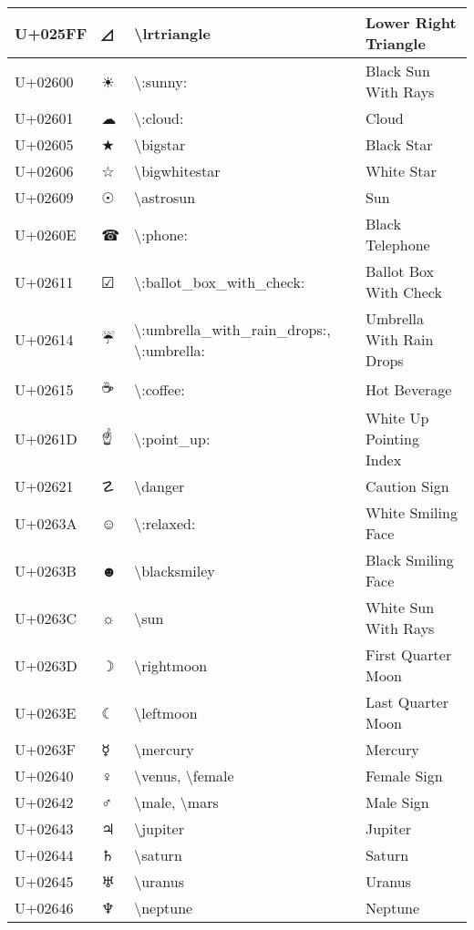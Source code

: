 \begin{table}[h]
\begin{tabulary}{\linewidth}{|L|L|L|L|}
\hline
U+025FF & ◿ & {\textbackslash}lrtriangle & Lower Right Triangle \\
\hline
U+02600 & ☀ & {\textbackslash}:sunny: & Black Sun With Rays \\
\hline
U+02601 & ☁ & {\textbackslash}:cloud: & Cloud \\
\hline
U+02605 & ★ & {\textbackslash}bigstar & Black Star \\
\hline
U+02606 & ☆ & {\textbackslash}bigwhitestar & White Star \\
\hline
U+02609 & ☉ & {\textbackslash}astrosun & Sun \\
\hline
U+0260E & ☎ & {\textbackslash}:phone: & Black Telephone \\
\hline
U+02611 & ☑ & {\textbackslash}:ballot\_box\_with\_check: & Ballot Box With Check \\
\hline
U+02614 & ☔ & {\textbackslash}:umbrella\_with\_rain\_drops:, {\textbackslash}:umbrella: & Umbrella With Rain Drops \\
\hline
U+02615 & ☕ & {\textbackslash}:coffee: & Hot Beverage \\
\hline
U+0261D & ☝ & {\textbackslash}:point\_up: & White Up Pointing Index \\
\hline
U+02621 & ☡ & {\textbackslash}danger & Caution Sign \\
\hline
U+0263A & ☺ & {\textbackslash}:relaxed: & White Smiling Face \\
\hline
U+0263B & ☻ & {\textbackslash}blacksmiley & Black Smiling Face \\
\hline
U+0263C & ☼ & {\textbackslash}sun & White Sun With Rays \\
\hline
U+0263D & ☽ & {\textbackslash}rightmoon & First Quarter Moon \\
\hline
U+0263E & ☾ & {\textbackslash}leftmoon & Last Quarter Moon \\
\hline
U+0263F & ☿ & {\textbackslash}mercury & Mercury \\
\hline
U+02640 & ♀ & {\textbackslash}venus, {\textbackslash}female & Female Sign \\
\hline
U+02642 & ♂ & {\textbackslash}male, {\textbackslash}mars & Male Sign \\
\hline
U+02643 & ♃ & {\textbackslash}jupiter & Jupiter \\
\hline
U+02644 & ♄ & {\textbackslash}saturn & Saturn \\
\hline
U+02645 & ♅ & {\textbackslash}uranus & Uranus \\
\hline
U+02646 & ♆ & {\textbackslash}neptune & Neptune \\

\end{tabulary}
\end{table}
